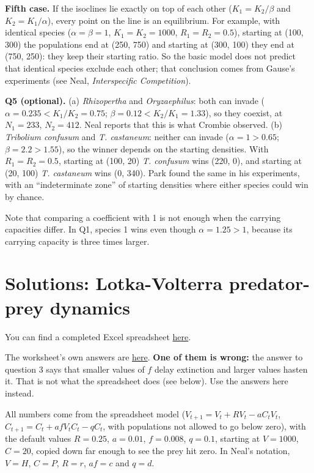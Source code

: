 \documentclass[
  a4paper]{book}
\begin{document}
\textbf{Fifth case.} If the isoclines lie exactly on top of each other (\(K_1 = K_2/\beta\) and \(K_2 = K_1/\alpha\)), every point on the line is an equilibrium. For example, with identical species (\(\alpha = \beta = 1\), \(K_1 = K_2 = 1000\), \(R_1 = R_2 = 0.5\)), starting at (100, 300) the populations end at (250, 750) and starting at (300, 100) they end at (750, 250): they keep their starting ratio. So the basic model does not predict that identical species exclude each other; that conclusion comes from Gause's experiments (see Neal, \emph{Interspecific Competition}).

\textbf{Q5 (optional).} (a) \emph{Rhizopertha} and \emph{Oryzaephilus}: both can invade (\(\alpha = 0.235 < K_1/K_2 = 0.75\); \(\beta = 0.12 < K_2/K_1 = 1.33\)), so they coexist, at \(N_1 = 233\), \(N_2 = 412\). Neal reports that this is what Crombie observed. (b) \emph{Tribolium confusum} and \emph{T. castaneum}: neither can invade (\(\alpha = 1 > 0.65\); \(\beta = 2.2 > 1.55\)), so the winner depends on the starting densities. With \(R_1 = R_2 = 0.5\), starting at (100, 20) \emph{T. confusum} wins (220, 0), and starting at (20, 100) \emph{T. castaneum} wins (0, 340). Park found the same in his experiments, with an ``indeterminate zone'' of starting densities where either species could win by chance.

Note that comparing a coefficient with 1 is not enough when the carrying capacities differ. In Q1, species 1 wins even though \(\alpha = 1.25 > 1\), because its carrying capacity is three times larger.

\section{Solutions: Lotka-Volterra predator-prey dynamics}\label{solutions-lotka-volterra-predator-prey-dynamics}

You can find a completed Excel spreadsheet \href{https://www.dropbox.com/s/wet7brtgxywdqi5/10.\%20Pred-PreyDynamics.xlsx?dl=1}{here}.

The worksheet's own answers are \href{https://www.dropbox.com/s/mt43nvqu7cjif69/10.\%20Answers\%20to\%20Pred-Prey\%20exercise.pdf?dl=1}{here}. \textbf{One of them is wrong:} the answer to question 3 says that smaller values of \(f\) delay extinction and larger values hasten it. That is not what the spreadsheet does (see below). Use the answers here instead.

All numbers come from the spreadsheet model (\(V_{t+1} = V_t + RV_t - aC_tV_t\), \(C_{t+1} = C_t + afV_tC_t - qC_t\), with populations not allowed to go below zero), with the default values \(R = 0.25\), \(a = 0.01\), \(f = 0.008\), \(q = 0.1\), starting at \(V = 1000\), \(C = 20\), copied down far enough to see the prey hit zero. In Neal's notation, \(V = H\), \(C = P\), \(R = r\), \(af = c\) and \(q = d\).
\end{document}
